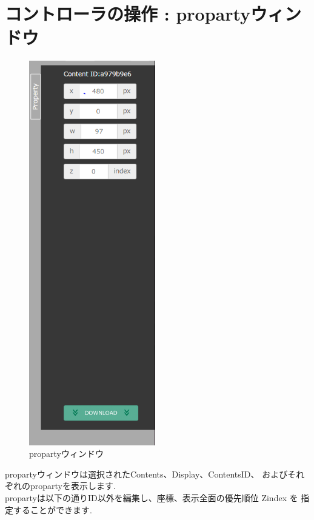 \documentclass[a4paper,10pt,oneside]{jsbook}
\begin{document}
\clearpage 

\chapter{コントローラの操作 : propartyウィンドウ }
\begin{figure}
	\begin{center}
		\includegraphics[width=5.5cm]{image/Prop_Down.PNG}
	\end{center}
	\caption{propartyウィンドウ}
	\label{fig:propall}
\end{figure}

propartyウィンドウは選択されたContents、Display、ContentsID、
およびそれぞれのpropartyを表示します.\\

propartyは以下の通りID以外を編集し、座標、表示全面の優先順位 Zindex を
指定することができます.\\
\end{document}
